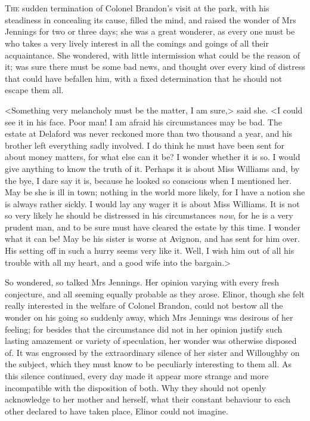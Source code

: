 \chapter[Chapter \thechapter]{}
\lettrine[lraise=0.3]{T}{he} sudden termination of Colonel Brandon's visit at the park, with his steadiness in concealing its cause, filled the mind, and raised the wonder of Mrs Jennings for two or three days; she was a great wonderer, as every one must be who takes a very lively interest in all the comings and goings of all their acquaintance. She wondered, with little intermission what could be the reason of it; was sure there must be some bad news, and thought over every kind of distress that could have befallen him, with a fixed determination that he should not escape them all.

<Something very melancholy must be the matter, I am sure,> said she. <I could see it in his face. Poor man! I am afraid his circumstances may be bad. The estate at Delaford was never reckoned more than two thousand a year, and his brother left everything sadly involved. I do think he must have been sent for about money matters, for what else can it be? I wonder whether it is so. I would give anything to know the truth of it. Perhaps it is about Miss Williams and, by the bye, I dare say it is, because he looked so conscious when I mentioned her. May be she is ill in town; nothing in the world more likely, for I have a notion she is always rather sickly. I would lay any wager it is about Miss Williams. It is not so very likely he should be distressed in his circumstances \textit{now}, for he is a very prudent man, and to be sure must have cleared the estate by this time. I wonder what it can be! May be his sister is worse at Avignon, and has sent for him over. His setting off in such a hurry seems very like it. Well, I wish him out of all his trouble with all my heart, and a good wife into the bargain.>

So wondered, so talked Mrs Jennings. Her opinion varying with every fresh conjecture, and all seeming equally probable as they arose. Elinor, though she felt really interested in the welfare of Colonel Brandon, could not bestow all the wonder on his going so suddenly away, which Mrs Jennings was desirous of her feeling; for besides that the circumstance did not in her opinion justify such lasting amazement or variety of speculation, her wonder was otherwise disposed of. It was engrossed by the extraordinary silence of her sister and Willoughby on the subject, which they must know to be peculiarly interesting to them all. As this silence continued, every day made it appear more strange and more incompatible with the disposition of both. Why they should not openly acknowledge to her mother and herself, what their constant behaviour to each other declared to have taken place, Elinor could not imagine.

